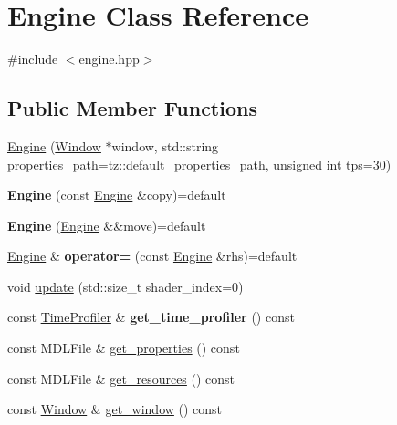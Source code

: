 \hypertarget{class_engine}{}\section{Engine Class Reference}
\label{class_engine}


{\ttfamily \#include $<$engine.\+hpp$>$}

\subsection*{Public Member Functions}
\begin{DoxyCompactItemize}
\item 
\mbox{\hyperlink{class_engine_a1e76f3786243e116f071e98724fe4a25}{Engine}} (\mbox{\hyperlink{class_window}{Window}} $\ast$window, std\+::string properties\+\_\+path=tz\+::default\+\_\+properties\+\_\+path, unsigned int tps=30)
\item 
\mbox{\label{class_engine_ae115127e3dcb6916f44b070cd94eec86}} 
{\bfseries Engine} (const \mbox{\hyperlink{class_engine}{Engine}} \&copy)=default
\item 
\mbox{\label{class_engine_a21831fd3d22bba5db978ed8f6a5a13e1}} 
{\bfseries Engine} (\mbox{\hyperlink{class_engine}{Engine}} \&\&move)=default
\item 
\mbox{\label{class_engine_ab1e81e6840409144537a1ba54d1ad5eb}} 
\mbox{\hyperlink{class_engine}{Engine}} \& {\bfseries operator=} (const \mbox{\hyperlink{class_engine}{Engine}} \&rhs)=default
\item 
void \mbox{\hyperlink{class_engine_a12375001d456a8beb1b51c5f97ad6c22}{update}} (std\+::size\+\_\+t shader\+\_\+index=0)
\item 
\mbox{\label{class_engine_abaf7e650f53c4d2564de41a9057436c8}} 
const \mbox{\hyperlink{class_time_profiler}{Time\+Profiler}} \& {\bfseries get\+\_\+time\+\_\+profiler} () const
\item 
const M\+D\+L\+File \& \mbox{\hyperlink{class_engine_a17d339997f946c7156a65da927f69c2e}{get\+\_\+properties}} () const
\item 
const M\+D\+L\+File \& \mbox{\hyperlink{class_engine_af9664f90857d014e7bf5245380a1519a}{get\+\_\+resources}} () const
\item 
const \mbox{\hyperlink{class_window}{Window}} \& \mbox{\hyperlink{class_engine_a30c10f14f67c8f6b0b6d0f47393ea31c}{get\+\_\+window}} () const

\end{DoxyCompactItemize}
